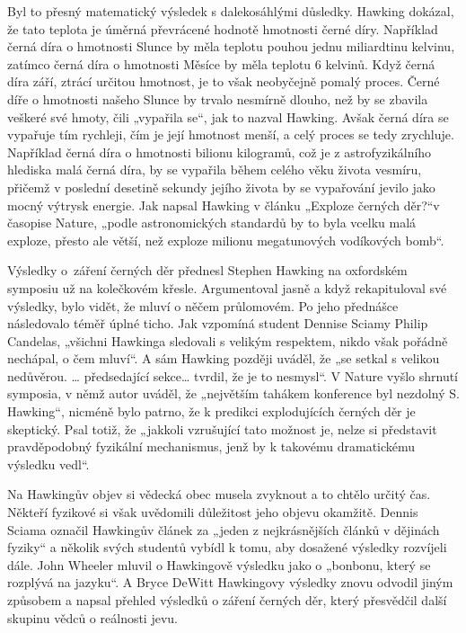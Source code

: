   Byl to přesný matematický výsledek s dalekosáhlými důsledky. Hawking dokázal, že tato teplota je
  úměrná převrácené hodnotě hmotnosti černé díry. Například černá díra o hmotnosti Slunce by měla
  teplotu pouhou jednu miliardtinu kelvinu, zatímco černá díra o hmotnosti Měsíce by měla teplotu 6
  kelvinů. Když černá díra září, ztrácí určitou hmotnost, je to však neobyčejně pomalý proces. Černé
  díře o hmotnosti našeho Slunce by trvalo nesmírně dlouho, než by se zbavila veškeré své hmoty,
  čili „vypařila se“, jak to nazval Hawking. Avšak černá díra se vypařuje tím rychleji, čím je její
  hmotnost menší, a celý proces se tedy zrychluje. Například černá díra o hmotnosti bilionu
  kilogramů, což je z astrofyzikálního hlediska malá černá díra, by se vypařila během celého věku
  života vesmíru, přičemž v poslední desetině sekundy jejího života by se vypařování jevilo jako
  mocný výtrysk energie. Jak napsal Hawking v článku „Exploze černých děr?“v časopise Nature, „podle
  astronomických standardů by to byla vcelku malá exploze, přesto ale větší, než exploze milionu
  megatunových vodíkových bomb“. 
  
  Výsledky o záření černých děr přednesl Stephen Hawking na oxfordském symposiu už na kolečkovém
  křesle. Argumentoval jasně a když rekapituloval své výsledky, bylo vidět, že mluví o něčem
  průlomovém. Po jeho přednášce následovalo téměř úplné ticho. Jak vzpomíná student Dennise Sciamy
  Philip Candelas, „všichni Hawkinga sledovali s velikým respektem, nikdo však pořádně nechápal, o
  čem mluví“. A sám Hawking později uváděl, že „se setkal s velikou nedůvěrou. … předsedající sekce…
  tvrdil, že je to nesmysl“. V Nature vyšlo shrnutí symposia, v němž autor uváděl, že „největším
  tahákem konference byl nezdolný S. Hawking“, nicméně bylo patrno, že k predikci explodujících
  černých děr je skeptický. Psal totiž, že „jakkoli vzrušující tato možnost je, nelze si představit
  pravděpodobný fyzikální mechanismus, jenž by k takovému dramatickému výsledku vedl“. 
  
  Na Hawkingův objev si vědecká obec musela zvyknout a to chtělo určitý čas. Někteří fyzikové si
  však uvědomili důležitost jeho objevu okamžitě. Dennis Sciama označil Hawkingův článek za „jeden z
  nejkrásnějších článků v dějinách fyziky“ a několik svých studentů vybídl k tomu, aby dosažené
  výsledky rozvíjeli dále. John Wheeler mluvil o Hawkingově výsledku jako o „bonbonu, který se
  rozplývá na jazyku“. A Bryce DeWitt Hawkingovy výsledky znovu odvodil jiným způsobem a napsal
  přehled výsledků o záření černých děr, který přesvědčil další skupinu vědců o reálnosti jevu. 
  
